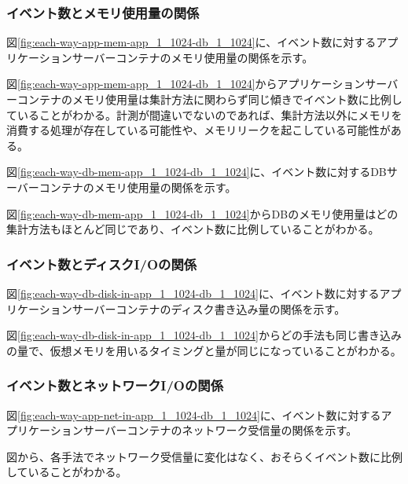 \documentclass[../../../../main]{subfiles}
\begin{document}
    \subsubsection{イベント数とメモリ使用量の関係}\label{subsubsubsec:result-each-way-only-limit-mem}

    図\ref{fig:each-way-app-mem-app_1_1024-db_1_1024}に、イベント数に対するアプリケーションサーバーコンテナのメモリ使用量の関係を示す。

    

    図\ref{fig:each-way-app-mem-app_1_1024-db_1_1024}からアプリケーションサーバーコンテナのメモリ使用量は集計方法に関わらず同じ傾きでイベント数に比例していることがわかる。計測が間違いでないのであれば、集計方法以外にメモリを消費する処理が存在している可能性や、メモリリークを起こしている可能性がある。

    図\ref{fig:each-way-db-mem-app_1_1024-db_1_1024}に、イベント数に対するDBサーバーコンテナのメモリ使用量の関係を示す。

    

    図\ref{fig:each-way-db-mem-app_1_1024-db_1_1024}からDBのメモリ使用量はどの集計方法もほとんど同じであり、イベント数に比例していることがわかる。

    \subsubsection{イベント数とディスクI/Oの関係}\label{subsubsubsec:result-each-way-only-limit-disk-io}

    図\ref{fig:each-way-db-disk-in-app_1_1024-db_1_1024}に、イベント数に対するアプリケーションサーバーコンテナのディスク書き込み量の関係を示す。

    

    図\ref{fig:each-way-db-disk-in-app_1_1024-db_1_1024}からどの手法も同じ書き込みの量で、仮想メモリを用いるタイミングと量が同じになっていることがわかる。

    \subsubsection{イベント数とネットワークI/Oの関係}\label{subsubsubsec:result-each-way-only-limit-net-io}

    図\ref{fig:each-way-app-net-in-app_1_1024-db_1_1024}に、イベント数に対するアプリケーションサーバーコンテナのネットワーク受信量の関係を示す。

    

    図から、各手法でネットワーク受信量に変化はなく、おそらくイベント数に比例していることがわかる。
\end{document}
